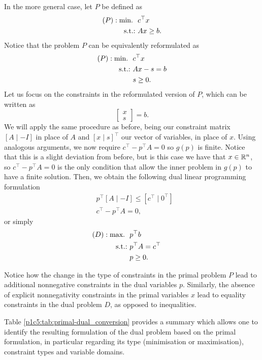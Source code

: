 In the more general case, let $P$ be defined as
%
\begin{align*}
	(P) : \mathop{\text{min.~}} \ & c^\top x \\
	\mathop{\text{s.t.:~}} 	  & Ax \geq b.  
\end{align*}
%
Notice that the problem $P$ can be equivalently reformulated as
%
\begin{align*}
	(P) : \mathop{\text{min.~}} \ & c^\top x \\
	\mathop{\text{s.t.:~}} & Ax - s = b \\
	& s \geq 0.
\end{align*}
%
Let us focus on the constraints in the reformulated version of $P$, which can be written as
%
\begin{equation*}
	[A \mid -I] \begin{bmatrix} x \\ s \end{bmatrix} = b. 
\end{equation*}
%
We will apply the same procedure as before, being our constraint matrix $[A \mid -I]$ in place of $A$ and $[x \mid s]^\top$ our vector of variables, in place of $x$. Using analogous arguments, we now require $c^\top - p^\top A = 0$ so $g(p)$ is finite. Notice that this is a slight deviation from before, but is this case we have that $x \in \mathbb{R}^n$, so $c^\top - p^\top A = 0$ is the only condition that allow the inner problem in $g(p)$ to have a finite solution. Then, we obtain the following dual linear programming formulation
%
\begin{align*}
	&p^\top [A \mid -I] \leq [c^\top \mid 0^\top]  \\
	&c^\top - p^\top A = 0, 
\end{align*}
%
or simply
%
\begin{align*}
	(D) : \mathop{\text{max.~}} \ & p^\top b  \hspace{1.5cm}\\ 
	\mathop{\text{s.t.:~}} & p^\top A = c^\top \\
	& p \geq 0.
\end{align*}

Notice how the change in the type of constraints in the primal problem $P$ lead to additional nonnegative constraints in the dual variables $p$. Similarly, the absence of explicit nonnegativity constraints in the primal variables $x$ lead to equality constraints in the dual problem $D$, as opposed to inequalities. 

Table \ref{p1c5:tab:primal-dual_conversion} provides a summary which allows one to identify the resulting formulation of the dual problem based on the primal formulation, in particular regarding its type (minimisation or maximisation), constraint types and variable domains.

